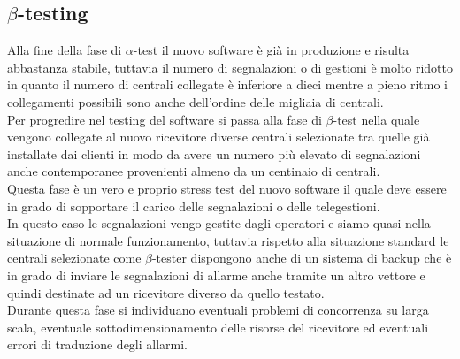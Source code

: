 \subsection{$\beta$-testing}
Alla fine della fase di $ \alpha$-test il nuovo software è già in produzione e risulta abbastanza stabile, tuttavia il numero di segnalazioni o di gestioni è molto ridotto in quanto il numero di centrali collegate è inferiore a dieci mentre a pieno ritmo i collegamenti possibili sono anche dell'ordine delle migliaia di centrali.\\
Per progredire nel testing del software si passa alla fase di $ \beta$-test nella quale vengono collegate al nuovo ricevitore diverse centrali selezionate tra quelle già installate dai clienti in modo da avere un numero più elevato di segnalazioni anche contemporanee provenienti almeno da un centinaio di centrali.\\
Questa fase è un vero e proprio stress test del nuovo software il quale deve essere in grado di sopportare il carico delle segnalazioni o delle telegestioni.\\
In questo caso le segnalazioni vengo gestite dagli operatori e siamo quasi nella situazione di normale funzionamento, tuttavia rispetto alla situazione standard le centrali selezionate come $ \beta$-tester dispongono anche di un sistema di backup che è in grado di inviare le segnalazioni di allarme anche tramite un altro vettore e quindi destinate ad un ricevitore diverso da quello testato.\\
Durante questa fase si individuano eventuali problemi di concorrenza su larga scala, eventuale sottodimensionamento delle risorse del ricevitore ed eventuali errori di traduzione degli allarmi.
